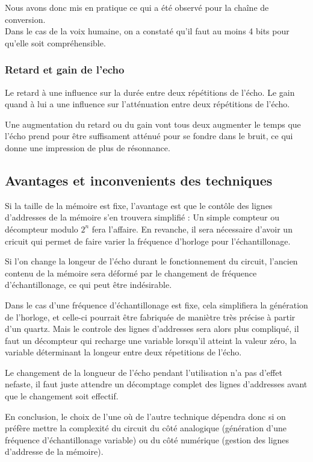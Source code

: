 \documentclass{article}
\begin{document}
Nous avons donc mis en pratique ce qui a été observé pour la chaîne de conversion.\\
Dans le cas de la voix humaine, on a constaté qu'il faut au moins 4 bits pour qu'elle soit compréhensible.


\subsubsection{Retard et gain de l'echo}
Le retard à une influence sur la durée entre deux répétitions de l'écho.
Le gain quand à lui a une influence sur l'atténuation entre deux répétitions de l'écho.

Une augmentation du retard ou du gain vont tous deux augmenter le temps que l'écho prend pour être suffisament atténué pour se fondre dans le bruit, ce qui donne une impression de plus de résonnance.

\subsection{Avantages et inconvenients des techniques}
Si la taille de la mémoire est fixe, l'avantage est que le contôle des lignes d'addresses de la mémoire s'en trouvera simplifié : Un simple compteur ou décompteur modulo $2^n$ fera l'affaire.
En revanche, il sera nécessaire d'avoir un cricuit qui permet de faire varier la fréquence d'horloge pour l'échantillonage.

Si l'on change la longeur de l'écho durant le fonctionnement du circuit, l'ancien contenu de la mémoire sera déformé par le changement de fréquence d'échantillonage, ce qui peut être indésirable.

Dans le cas d'une fréquence d'échantillonage est fixe, cela simplifiera la génération de l'horloge, et celle-ci pourrait être fabriquée de maniètre très précise à partir d'un quartz.
Mais le controle des lignes d'addresses sera alors plus compliqué, il faut un décompteur qui recharge une variable lorsqu'il atteint la valeur zéro, la variable déterminant la longeur entre deux répetitions de l'écho.

Le changement de la longueur de l'écho pendant l'utilisation n'a pas d'effet nefaste, il faut juste attendre un décomptage complet des lignes d'addresses avant que le changement soit effectif.

En conclusion, le choix de l'une où de l'autre technique dépendra donc si on préfère mettre la complexité du circuit du côté analogique (génération d'une fréquence d'échantillonage variable) ou du côté numérique (gestion des lignes d'addresse de la mémoire).
\end{document}
